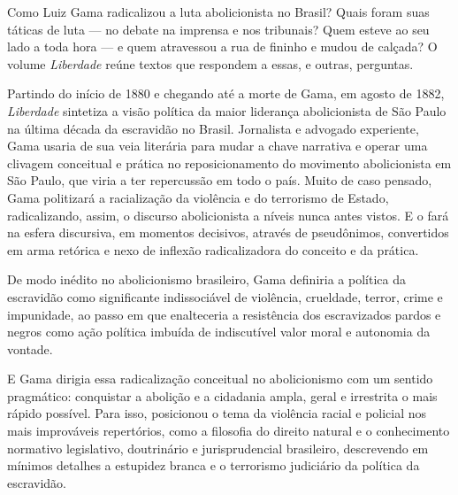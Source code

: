\vspace*{1.5cm}
\bigskip

\hfill{}
\bigskip
\bigskip
\bigskip

\begin{multicols}{2}
\noindent{}Como Luiz Gama radicalizou a luta abolicionista no Brasil? Quais foram suas táticas de luta --- no debate na imprensa e nos tribunais? Quem esteve ao seu lado a toda 
hora --- e quem atravessou a rua de fininho e mudou de calçada?
O volume \textit{Liberdade} reúne textos que respondem a essas, e outras, perguntas.

Partindo do início de 1880 e chegando até a morte de Gama, em agosto de 1882, \textit{Liberdade} sintetiza a visão política da maior liderança abolicionista de São Paulo na última década da escravidão no Brasil. Jornalista e advogado experiente, Gama usaria de sua veia literária para mudar a chave narrativa e operar uma clivagem conceitual e prática no reposicionamento do movimento abolicionista em São Paulo, que viria a ter repercussão em todo o país. Muito de caso pensado, Gama politizará a racialização da violência e do terrorismo de Estado, radicalizando, assim, o discurso abolicionista a níveis nunca antes vistos. E o fará na esfera discursiva, em momentos decisivos, através de pseudônimos, convertidos em arma retórica e nexo de inflexão radicalizadora do conceito e da prática.

De modo inédito no abolicionismo brasileiro, Gama definiria a política da escravidão como significante indissociável de violência, crueldade, terror, crime e impunidade, ao passo em que enalteceria a resistência dos escravizados pardos e negros como ação política imbuída de indiscutível valor moral e autonomia da vontade.

\vspace{\baselineskip}
{\small{}}
\vspace{\baselineskip}

E Gama dirigia essa radicalização conceitual no abolicionismo com um sentido pragmático: conquistar a abolição e a cidadania ampla, geral e irrestrita o mais rápido possível. Para isso, posicionou o tema da violência racial e policial nos mais improváveis repertórios, como a filosofia do direito natural e o conhecimento normativo legislativo, doutrinário e jurisprudencial brasileiro, descrevendo em mínimos detalhes a estupidez branca e o terrorismo judiciário da política da escravidão.


\end{multicols}
